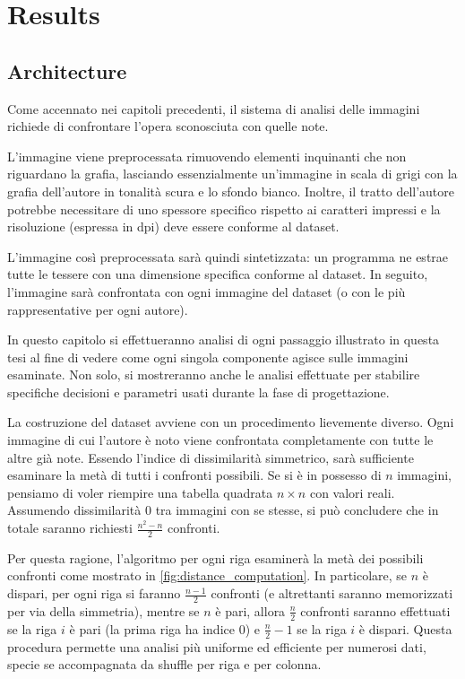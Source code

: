 \chapter{Results}
\begin{toDo}
	\section{Architecture}
	Come accennato nei capitoli precedenti, il sistema di analisi delle immagini richiede di confrontare l'opera sconosciuta con quelle note.

	\noindent L'immagine viene preprocessata rimuovendo elementi inquinanti che non riguardano la grafia, lasciando essenzialmente un'immagine in scala di grigi con la grafia dell'autore in tonalità scura e lo sfondo bianco. Inoltre, il tratto dell'autore potrebbe necessitare di uno spessore specifico rispetto ai caratteri impressi e la risoluzione (espressa in \gls{dpi}) deve essere conforme al dataset.

	\noindent L'immagine così preprocessata sarà quindi sintetizzata: un programma ne estrae tutte le tessere con una dimensione specifica conforme al dataset. In seguito, l'immagine sarà confrontata con ogni immagine del dataset (o con le più rappresentative per ogni autore).

	\noindent In questo capitolo si effettueranno analisi di ogni passaggio illustrato in questa tesi al fine di vedere come ogni singola componente agisce sulle immagini esaminate. Non solo, si mostreranno anche le analisi effettuate per stabilire specifiche decisioni e parametri usati durante la fase di progettazione.

	\bigskip\noindent La costruzione del dataset avviene con un procedimento lievemente diverso. Ogni immagine di cui l'autore è noto viene confrontata completamente con tutte le altre già note. Essendo l'indice di dissimilarità simmetrico, sarà sufficiente esaminare la metà di tutti i confronti possibili. Se si è in possesso di $n$ immagini, pensiamo di voler riempire una tabella quadrata $n\times n$ con valori reali. Assumendo dissimilarità $0$ tra immagini con se stesse, si può concludere che in totale saranno richiesti $\frac{n^2-n}{2}$ confronti.

	\noindent Per questa ragione, l'algoritmo per ogni riga esaminerà la metà dei possibili confronti come mostrato in \cref{fig:distance_computation}. In particolare, se $n$ è dispari, per ogni riga si faranno $\frac{n-1}{2}$ confronti (e altrettanti saranno memorizzati per via della simmetria), mentre se $n$ è pari, allora $\frac{n}{2}$ confronti saranno effettuati se la riga $i$ è pari (la prima riga ha indice $0$) e $\frac{n}{2}-1$ se la riga $i$ è dispari. Questa procedura permette una analisi più uniforme ed efficiente per numerosi dati, specie se accompagnata da shuffle per riga e per colonna.


\end{toDo}
